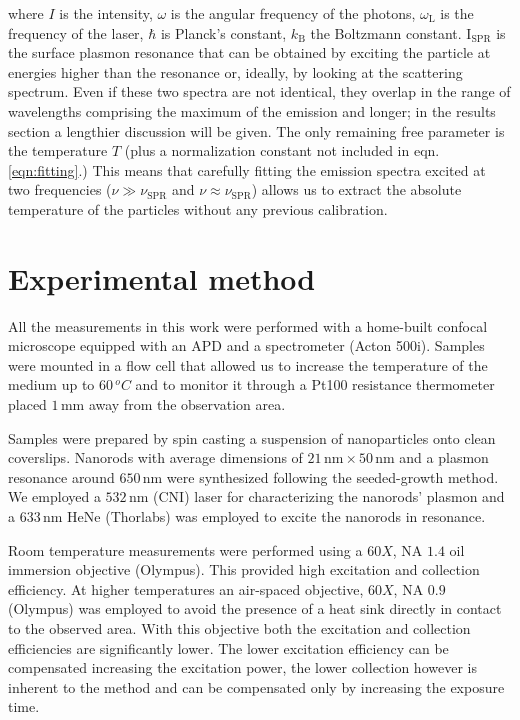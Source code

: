 \documentclass[journal=nalefd,manuscript=letter]{achemso}
\newcommand{\nm}{\ensuremath{\,\textrm{nm}}}
\newcommand{\mm}{\ensuremath{\,\textrm{mm}}}
\begin{document}
\noindent where $I$ is the intensity, $\omega$ is the angular frequency of the
photons, $\omega_\textrm{L}$ is the frequency of the laser, $\hbar$ is Planck's
constant, $k_\textrm{B}$ the Boltzmann constant. $\textrm{I}_{\textrm{SPR}}$ is
the surface plasmon resonance that can be obtained by exciting the particle at
energies higher than the resonance or, ideally, by looking at the scattering
spectrum. Even if these two spectra are not identical, they overlap in the range
of wavelengths comprising the maximum of the emission and
longer\cite{Yorulmaz2012}; in the results section a lengthier discussion will be
given. The only remaining free parameter is the temperature $T$ (plus a
normalization constant not included in eqn.
\ref{eqn:fitting}.) This means that carefully fitting the emission spectra
excited at two frequencies ($\nu\gg\nu_{\textrm{SPR}}$ and
$\nu\approx\nu_{\textrm{SPR}}$) allows us to extract the absolute temperature of
the particles without any previous calibration.


\section{Experimental method}
All the measurements in this work were performed with a home-built confocal
microscope equipped with an APD and a spectrometer (Acton 500i). Samples were
mounted in a flow cell that allowed us to increase the temperature of the medium
up to $60\,^oC$ and to monitor it through a Pt100 resistance thermometer placed
$1\mm$ away from the observation area.

Samples were prepared by spin casting a suspension of nanoparticles onto clean
coverslips. Nanorods with average dimensions of $21\nm\times50\nm$ and a plasmon
resonance around $650\nm$ were synthesized following the seeded-growth
method\cite{Nikoobakht2003}. We employed a $532\nm$ (CNI) laser for
characterizing the nanorods' plasmon and a $633\nm$ HeNe (Thorlabs) was employed
to excite the nanorods in resonance.

Room temperature measurements were performed using a $60X$, NA $1.4$ oil
immersion objective (Olympus). This provided high excitation and collection
efficiency. At higher temperatures an air-spaced objective, $60X$, NA $0.9$
(Olympus) was employed to avoid the presence of a heat sink directly in contact
to the observed area. With this objective both the excitation and collection
efficiencies are significantly lower. The lower excitation efficiency can be
compensated increasing the excitation power, the lower collection however is
inherent to the method and can be compensated only by increasing the exposure
time.
\end{document}
